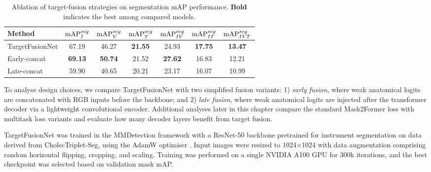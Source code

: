 \begin{table}[t]
\centering
\caption{Ablation of target-fusion strategies on segmentation mAP performance. \textbf{Bold} indicates the best among compared models.}
\label{tab:ablation_seg}
\begin{tabular}{lcccccc}
\toprule
\textbf{Method} & $\textrm{mAP}_{I}^{seg}$ & $\textrm{mAP}_{V}^{seg}$ & $\textrm{mAP}_{T}^{seg}$ & $\textrm{mAP}_{IV}^{seg}$ & $\textrm{mAP}_{IT}^{seg}$ & $\textrm{mAP}_{IVT}^{seg}$ \\
\bottomrule
TargetFusionNet  & 67.19 & 46.27 & \textbf{21.55} & 24.93 & \textbf{17.75} & \textbf{13.47}\\
\hline
Early-concat  & \textbf{69.13} & \textbf{50.74 }& 21.52 & \textbf{27.62} & 16.83 & 12.21 \\
Late-concat & 59.90 & 40.65 & 20.21 & 23.17 & 16.07 & 10.99 \\
\hline
\end{tabular}
\end{table}



To analyse design choices, we compare TargetFusionNet with two simplified fusion variants:  
1) \emph{early fusion}, where weak anatomical logits are concatenated with RGB inputs before the backbone;
and  
2) \emph{late fusion}, where weak anatomical logits are injected after the transformer decoder via a lightweight convolutional encoder.  
%
Additional analyses later in this chapter compare the standard Mask2Former loss with multitask loss variants and evaluate how many decoder layers benefit from target fusion.

TargetFusionNet was trained in the MMDetection \cite{mmdetection} framework with a ResNet-50 \cite{resnet} backbone pretrained for instrument segmentation on data derived from CholecTriplet-Seg, using the AdamW optimiser \cite{loshchilov2017decoupled}. Input images were resized to 1024×1024 with data augmentation comprising random horizontal flipping, cropping, and scaling. Training was performed on a single NVIDIA A100 GPU for 300k iterations, and the best checkpoint was selected based on validation mask mAP. 



